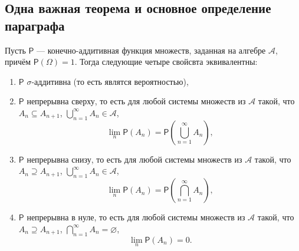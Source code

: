 \subsection{Одна важная теорема и основное определение параграфа}
\begin{theorem}
	Пусть $ \mathsf P $ --- конечно-аддитивная функция множеств, заданная на
	алгебре $ \mathscr A $, причём $ \mathsf P(\Omega) = 1 $. Тогда следующие
	четыре свойсвта эквивалентны:
	\begin{enumerate}[label={\rm\roman*)}]
		\item $ \mathsf P $ $ \sigma $-аддитивна (то есть являтся вероятностью),
		\item $ \mathsf P $ непрерывна сверху, то есть для любой системы множеств из
			$ \mathscr A $ такой, что $ A_n \subseteq A_{n+1} $, $
			\bigcup_{n=1}^\infty A_n \in \mathscr A $, 
			\[
				\lim_{n} \mathsf P(A_n) = \mathsf P \left( \bigcup_{n=1}^\infty A_n
				\right),
			\]
		\item $ \mathsf P $ непрерывна снизу, то есть для любой системы множеств из
			$ \mathscr A $ такой, что $ A_n \supseteq A_{n+1} $, $
			\bigcup_{n=1}^\infty A_n \in \mathscr A $, 
			\[
				\lim_n \mathsf P(A_n) = \mathsf P \left( \bigcap_{n=1}^\infty A_n
				\right),
			\]
		\item $ \mathsf P $ непрерывна в нуле, то есть для любой системы множеств из
			$ \mathscr A $ такой, что $ A_{n} \supseteq A_{n+1} $, $
			\bigcap_{n=1}^\infty A_n = \varnothing $, 
			\[
					\lim_n \mathsf P(A_n) = 0.
			\]
	\end{enumerate}
\end{theorem}
